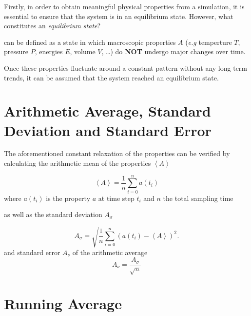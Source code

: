 \documentclass[
  letterpaper,
  DIV=11,
  numbers=noendperiod]{scrreprt}
\begin{document}
Firstly, in order to obtain meaningful physical properties from a
simulation, it is essential to ensure that the system is in an
equilibrium state. However, what constitutes an \emph{equilibrium
state}?

\begin{tcolorbox}[enhanced jigsaw, title=\textcolor{quarto-callout-important-color}{\faExclamation}\hspace{0.5em}{An equilibrium state:}, colbacktitle=quarto-callout-important-color!10!white, bottomtitle=1mm, breakable, colframe=quarto-callout-important-color-frame, toprule=.15mm, opacitybacktitle=0.6, bottomrule=.15mm, titlerule=0mm, arc=.35mm, rightrule=.15mm, toptitle=1mm, coltitle=black, left=2mm, opacityback=0, colback=white, leftrule=.75mm]

can be defined as a state in which macroscopic properties \(A\)
(\emph{e.g} temperture \(T\), pressure \(P\), energies \(E\), volume
\(V\), \ldots) do \textbf{NOT} undergo major changes over time.

\end{tcolorbox}

Once these properties fluctuate around a constant pattern without any
long-term trends, it can be assumed that the system reached an
equilibrium state.

\hypertarget{arithmetic-average-standard-deviation-and-standard-error}{%
\section{Arithmetic Average, Standard Deviation and Standard
Error}\label{arithmetic-average-standard-deviation-and-standard-error}}

The aforementioned constant relaxation of the properties can be verified
by calculating the arithmetic mean of the properties
\(\left < A \right >\)

\[
\left < A \right >  = \frac{1}{n}\sum_{i=0}^{n} a(t_{i})
\] where \(a(t_{i})\) is the property \(a\) at time step \(t_i\) and
\(n\) the total sampling time

as well as the standard deviation \(A_{\sigma }\)

\[
A_{\sigma }= \sqrt{ \frac{1}{n}\sum_{i=0}^{n} (a(t_{i}) - \left < A \right > )^2}.
\] and standard error \(A_{\nu}\) of the arithmetic average \[
A_{\nu} = \frac{A_{\sigma }}{\sqrt{n}}
\]

\hypertarget{running-average}{%
\section{Running Average}\label{running-average}}
\end{document}

